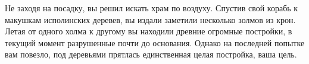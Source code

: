 Не заходя на посадку, вы решил искать храм по воздуху.
Спустив свой корабь к макушкам исполинских деревев, вы издали заметили несколько золмов из крон.
Летая от одного холма к другому вы находили древние огромные постройки, в текущий момент разрушенные почти до основания.
Однако на последней попытке вам повезло, под деревьями прятлась единственная целая постройка, ваша цель.